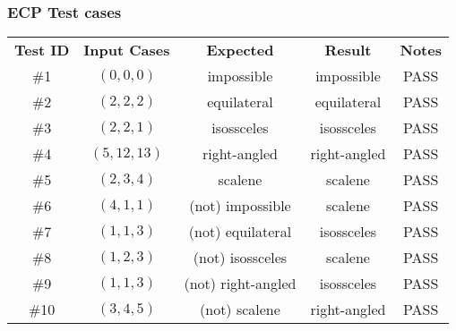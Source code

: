 \subsubsection{ECP Test cases}
\begin{center}
  \begin{tabular}{ccccc}
    \textbf{Test ID} & \textbf{Input Cases} & \textbf{Expected} & \textbf{Result} & \textbf{Notes} \\
    \#1  & $(0,0,0)$    & impossible    & impossible   & PASS  \\
    \#2  & $(2,2,2)$    & equilateral   & equilateral  & PASS  \\
    \#3  & $(2,2,1)$    & isossceles    & isossceles   & PASS  \\
    \#4  & $(5,12,13)$  & right-angled  & right-angled & PASS  \\
    \#5  & $(2,3,4)$    & scalene       & scalene      & PASS  \\
    \#6  & $(4,1,1)$    & (not) impossible   & scalene      & PASS \\
    \#7  & $(1,1,3)$    & (not) equilateral  & isossceles   & PASS \\
    \#8  & $(1,2,3)$    & (not) isossceles   & scalene      & PASS \\
    \#9  & $(1,1,3)$    & (not) right-angled & isossceles   & PASS \\
    \#10 & $(3,4,5)$    & (not) scalene      & right-angled & PASS \\
  \end{tabular}
\end{center}

